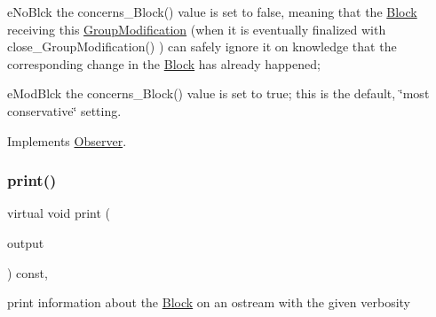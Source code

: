 \begin{DoxyItemize}
\item e\+No\+Blck the concerns\+\_\+\+Block() value is set to false, meaning that the \mbox{\hyperlink{class_s_m_spp__di__unipi__it_1_1_block}{Block}} receiving this \mbox{\hyperlink{class_s_m_spp__di__unipi__it_1_1_group_modification}{Group\+Modification}} (when it is eventually finalized with close\+\_\+\+Group\+Modification() ) can safely ignore it on knowledge that the corresponding change in the \mbox{\hyperlink{class_s_m_spp__di__unipi__it_1_1_block}{Block}} has already happened;
\item e\+Mod\+Blck the concerns\+\_\+\+Block() value is set to true; this is the default, \char`\"{}most conservative\char`\"{} setting. 
\end{DoxyItemize}

Implements \mbox{\hyperlink{class_s_m_spp__di__unipi__it_1_1_observer_acf7e46d450779f524e3655c5f31eecc8}{Observer}}.

\mbox{\label{class_s_m_spp__di__unipi__it_1_1_block_a2e7b9c9148a98c5c342e8c25cac95926}} 
\subsubsection{\texorpdfstring{print()}{print()}}
{\footnotesize\ttfamily virtual void print (\begin{DoxyParamCaption}\item[{std\+::ostream \&}]{output }\end{DoxyParamCaption}) const\hspace{0.3cm}{\ttfamily [protected]}, {\ttfamily [virtual]}}



print information about the \mbox{\hyperlink{class_s_m_spp__di__unipi__it_1_1_block}{Block}} on an ostream with the given verbosity 

